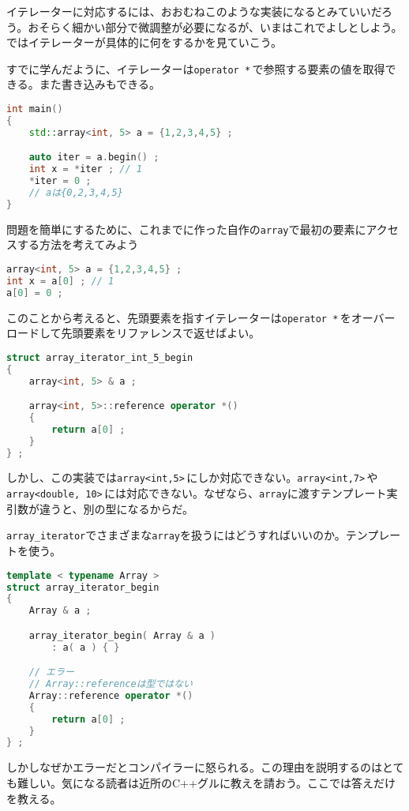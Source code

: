 イテレーターに対応するには、おおむねこのような実装になるとみていいだろう。おそらく細かい部分で微調整が必要になるが、いまはこれでよしとしよう。ではイテレーターが具体的に何をするかを見ていこう。

すでに学んだように、イテレーターは\texttt{operator *}\,で参照する要素の値を取得できる。また書き込みもできる。

\begin{lstlisting}[language={C++}]
int main()
{
    std::array<int, 5> a = {1,2,3,4,5} ;

    auto iter = a.begin() ;
    int x = *iter ; // 1
    *iter = 0 ;
    // aは{0,2,3,4,5}
}
\end{lstlisting}

問題を簡単にするために、これまでに作った自作の\texttt{array}で最初の要素にアクセスする方法を考えてみよう

\begin{lstlisting}[language={C++}]
array<int, 5> a = {1,2,3,4,5} ;
int x = a[0] ; // 1
a[0] = 0 ;
\end{lstlisting}

このことから考えると、先頭要素を指すイテレーターは\texttt{operator *}\,をオーバーロードして先頭要素をリファレンスで返せばよい。

\begin{lstlisting}[language={C++}]
struct array_iterator_int_5_begin
{
    array<int, 5> & a ;

    array<int, 5>::reference operator *()
    {
        return a[0] ;
    }
} ;
\end{lstlisting}

しかし、この実装では\texttt{array<int,5>}\,にしか対応できない。\texttt{array<int,7>}\,や\texttt{array<double, 10>}\,には対応できない。なぜなら、\texttt{array}に渡すテンプレート実引数が違うと、別の型になるからだ。

\texttt{array\_iterator}でさまざまな\texttt{array}を扱うにはどうすればいいのか。テンプレートを使う。

\begin{lstlisting}[language={C++}]
template < typename Array >
struct array_iterator_begin
{
    Array & a ;

    array_iterator_begin( Array & a )
        : a( a ) { }

    // エラー
    // Array::referenceは型ではない
    Array::reference operator *()
    {
        return a[0] ;
    }
} ;
\end{lstlisting}

しかしなぜかエラーだとコンパイラーに怒られる。この理由を説明するのはとても難しい。気になる読者は近所のC++グルに教えを請おう。ここでは答えだけを教える。

